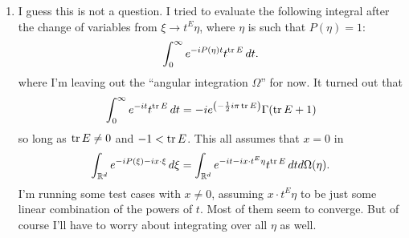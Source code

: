 \documentclass{book}
\theoremstyle{definition}
\newcommand{\lp}{\left(}
\newcommand{\rp}{\right)}
\begin{document}
\begin{enumerate}
	\item I guess this is not a question. I tried to evaluate the following integral after the change of variables from $\xi \to t^E\eta$, where $\eta$ is such that $P(\eta) = 1$:
	\begin{align*}
	\int_0^\infty e^{-iP(\eta)t}t^{\tr E}\,dt.
	\end{align*}
	where I'm leaving out the ``angular integration $\Omega$'' for now. It turned out that
	\begin{align*}
	\int_0^\infty e^{-it}t^{\tr E}\,dt =  -i e^{\lp-\frac{1}{2}i\pi\tr E\rp} \Gamma (\tr E+1)
	\end{align*}
	so long as $\tr E \neq 0$ and $-1 < \tr E$. This all assumes that $x=0$ in
	\begin{align*}
	\int_{\mathbb{R}^d}e^{-iP(\xi) - ix\cdot \xi}\,d\xi = \int_{\mathbb{R}^d}e^{-it - ix\cdot t^E \eta}t^{\tr E}\,dtd\Omega(\eta).
	\end{align*}
	I'm running some test cases with $x\neq 0$, assuming $x\cdot t^E \eta$ to be just some linear combination of the powers of $t$. Most of them seem to converge. But of course I'll have to worry about integrating over all $\eta$ as well.   
\end{enumerate}


	
	
	
\end{document}

